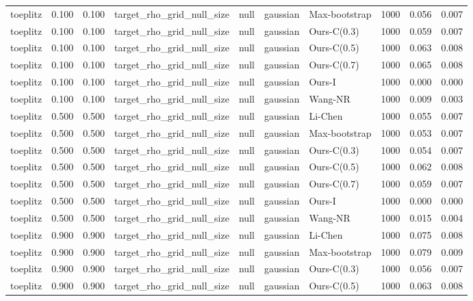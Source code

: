 \begin{tabular}{lrrllllrrr}
toeplitz & 0.100 & 0.100 & target\_rho\_grid\_null\_size & null & gaussian & Max-bootstrap & 1000 & 0.056 & 0.007 \\
toeplitz & 0.100 & 0.100 & target\_rho\_grid\_null\_size & null & gaussian & Ours-C(0.3) & 1000 & 0.059 & 0.007 \\
toeplitz & 0.100 & 0.100 & target\_rho\_grid\_null\_size & null & gaussian & Ours-C(0.5) & 1000 & 0.063 & 0.008 \\
toeplitz & 0.100 & 0.100 & target\_rho\_grid\_null\_size & null & gaussian & Ours-C(0.7) & 1000 & 0.065 & 0.008 \\
toeplitz & 0.100 & 0.100 & target\_rho\_grid\_null\_size & null & gaussian & Ours-I & 1000 & 0.000 & 0.000 \\
toeplitz & 0.100 & 0.100 & target\_rho\_grid\_null\_size & null & gaussian & Wang-NR & 1000 & 0.009 & 0.003 \\
toeplitz & 0.500 & 0.500 & target\_rho\_grid\_null\_size & null & gaussian & Li-Chen & 1000 & 0.055 & 0.007 \\
toeplitz & 0.500 & 0.500 & target\_rho\_grid\_null\_size & null & gaussian & Max-bootstrap & 1000 & 0.053 & 0.007 \\
toeplitz & 0.500 & 0.500 & target\_rho\_grid\_null\_size & null & gaussian & Ours-C(0.3) & 1000 & 0.054 & 0.007 \\
toeplitz & 0.500 & 0.500 & target\_rho\_grid\_null\_size & null & gaussian & Ours-C(0.5) & 1000 & 0.062 & 0.008 \\
toeplitz & 0.500 & 0.500 & target\_rho\_grid\_null\_size & null & gaussian & Ours-C(0.7) & 1000 & 0.059 & 0.007 \\
toeplitz & 0.500 & 0.500 & target\_rho\_grid\_null\_size & null & gaussian & Ours-I & 1000 & 0.000 & 0.000 \\
toeplitz & 0.500 & 0.500 & target\_rho\_grid\_null\_size & null & gaussian & Wang-NR & 1000 & 0.015 & 0.004 \\
toeplitz & 0.900 & 0.900 & target\_rho\_grid\_null\_size & null & gaussian & Li-Chen & 1000 & 0.075 & 0.008 \\
toeplitz & 0.900 & 0.900 & target\_rho\_grid\_null\_size & null & gaussian & Max-bootstrap & 1000 & 0.079 & 0.009 \\
toeplitz & 0.900 & 0.900 & target\_rho\_grid\_null\_size & null & gaussian & Ours-C(0.3) & 1000 & 0.056 & 0.007 \\
toeplitz & 0.900 & 0.900 & target\_rho\_grid\_null\_size & null & gaussian & Ours-C(0.5) & 1000 & 0.063 & 0.008 \\

\end{tabular}
